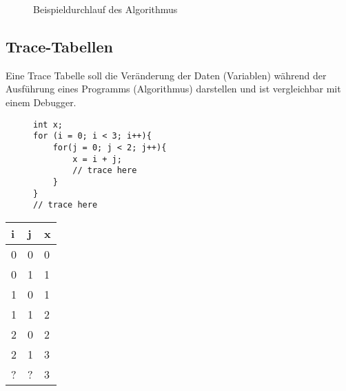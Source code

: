\begin{figure}[H]
{
    }
    \caption{Beispieldurchlauf des Algorithmus}
\end{figure}

\clearpage

\subsection{Trace-Tabellen}

Eine Trace Tabelle soll die Veränderung der Daten (Variablen)
während der Ausführung eines Programms (Algorithmus) darstellen
und ist vergleichbar mit einem Debugger.

\begin{figure}[H]
\begin{lstlisting}
int x;
for (i = 0; i < 3; i++){
    for(j = 0; j < 2; j++){
        x = i + j; 
        // trace here
    }
}
// trace here
\end{lstlisting}
\end{figure}

\begin{table}[H]
    \begin{tabular}{|l|l|l|}
    \hline
        i & j & x \\ \hline
        0 & 0 & 0 \\ \hline
        0 & 1 & 1 \\ \hline
        1 & 0 & 1 \\ \hline
        1 & 1 & 2 \\ \hline
        2 & 0 & 2 \\ \hline
        2 & 1 & 3 \\ \hline
        ? & ? & 3 \\ \hline
    \end{tabular}
\end{table}
